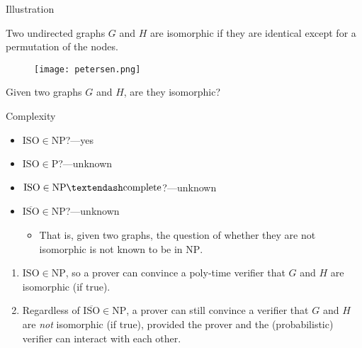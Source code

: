 \begin{frame}{Illustration}
\begin{definition}
Two undirected graphs $G$ and $H$ are isomorphic if they are identical except for a permutation of the nodes.
\end{definition}
\begin{figure}
    \centering
    \texttt{[image: petersen.png]}
\end{figure}
\begin{p}
Given two graphs $G$ and $H$, are they isomorphic?
\end{p}
\end{frame}

\begin{frame}{Complexity}
    \begin{itemize}
        \item $\mathrm{ISO} \in \mathrm{NP}$?---yes
        \item $\mathrm{ISO} \in \mathrm{P}$?---unknown
        \item $\mathrm{ISO} \in \mathrm{NP\textendash complete}$?---unknown
        \item $\overline{\mathrm{ISO}} \in \mathrm{NP}$?---unknown
        \begin{itemize}
            \item That is, given two graphs, the question of whether they are not isomorphic is not known to be in $\mathrm{NP}$.
        \end{itemize}
    \end{itemize}
    \begin{remarks}
    \begin{enumerate}
        \item $\mathrm{ISO} \in \mathrm{NP}$, so a prover can convince a poly-time verifier that $G$ and $H$ are isomorphic (if true).
        \item Regardless of $\overline{\mathrm{ISO}} \in \mathrm{NP}$, a prover can still convince a verifier that $G$ and $H$ are \textit{not} isomorphic (if true), provided the prover and the (probabilistic) verifier can interact with each other.
    \end{enumerate}
    \end{remarks}
\end{frame}

